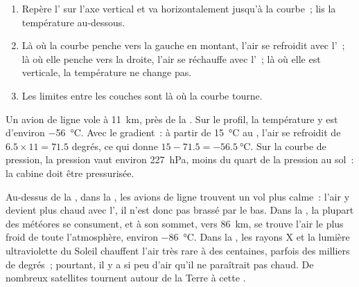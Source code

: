 \begin{method}\label{met:g8:the-atmosphere:profile}
\begin{enumerate}
  \item Repère l' sur l'axe vertical et va horizontalement jusqu'à
        la courbe~; lis la température au-dessous.
  \item Là où la courbe penche vers la gauche en montant, l'air se
        refroidit avec l'~; là où elle penche vers la droite, l'air
        se réchauffe avec l'~; là où elle est verticale, la
        température ne change pas.
  \item Les limites entre les couches sont là où la courbe tourne.
\end{enumerate}
\end{method}

\begin{example}\label{ex:g8:the-atmosphere:airliner}
Un avion de ligne vole à \qty{11}{km}, près de la . Sur le
profil, la température y est d'environ \qty{-56}{\degreeCelsius}. Avec le
gradient~: à partir de \qty{15}{\degreeCelsius} au ,
l'air se refroidit de $6.5 \times 11 = 71.5$ degrés, ce qui donne $15 - 71.5 =
\qty{-56.5}{\degreeCelsius}$. Sur la courbe de pression, la pression vaut
environ \qty{227}{hPa}, moins du quart de la pression au sol~: la cabine
doit être pressurisée.
\end{example}

Au-dessus de la , dans la , les avions de ligne
trouvent un vol plus calme~: l'air y devient plus chaud avec l',
il n'est donc pas brassé par le bas. Dans la , la plupart des
météores se consument, et à son sommet, vers \qty{86}{km}, se trouve l'air
le plus froid de toute l'atmosphère, environ \qty{-86}{\degreeCelsius}.
Dans la , les rayons X et la lumière ultraviolette du Soleil
chauffent l'air très rare à des centaines, parfois des milliers de
degrés~; pourtant, il y a si peu d'air qu'il ne paraîtrait pas chaud. De
nombreux satellites tournent autour de la Terre à cette .


